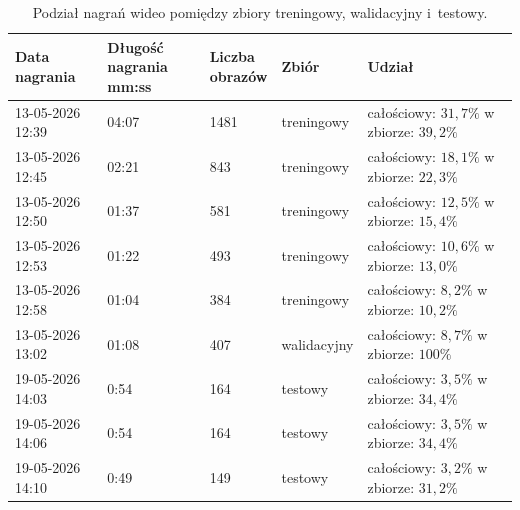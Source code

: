 \begin{table}[ht]
    \caption{Podział nagrań wideo pomiędzy zbiory treningowy, walidacyjny i~testowy.}
    \label{tab:video_split}
    \begin{tabularx}{\textwidth}{X|llll}
        \toprule
        \textbf{Data nagrania} &
        \makecell[tl]{\textbf{Długość nagrania} \\mm:ss} &
        \makecell[tl]{\textbf{Liczba}           \\\textbf{obrazów}} &
        \textbf{Zbiór}         &
        \textbf{Udział}                         \\
        \midrule
        \makecell[tl]{13-05-2026                \\12:39} & 04:07 & 1481 & treningowy & \makecell[tl]{całościowy: $31,7\%$\\w zbiorze: $39,2\%$} \\
        \makecell[tl]{13-05-2026                \\12:45} & 02:21 & 843 & treningowy & \makecell[tl]{całościowy: $18,1\%$\\w zbiorze: $22,3\%$} \\
        \makecell[tl]{13-05-2026                \\12:50} & 01:37 & 581 & treningowy & \makecell[tl]{całościowy: $12,5\%$\\w zbiorze: $15,4\%$} \\
        \makecell[tl]{13-05-2026                \\12:53} & 01:22 & 493 & treningowy & \makecell[tl]{całościowy: $10,6\%$\\w zbiorze: $13,0\%$} \\
        \makecell[tl]{13-05-2026                \\12:58} & 01:04 & 384 & treningowy & \makecell[tl]{całościowy: $8,2\%$\\w zbiorze: $10,2\%$} \\
        \makecell[tl]{13-05-2026                \\13:02} & 01:08 & 407 & walidacyjny & \makecell[tl]{całościowy: $8,7\%$\\w zbiorze: $100\%$} \\
        \makecell[tl]{19-05-2026                \\14:03} & 0:54 & 164 & testowy & \makecell[tl]{całościowy: $3,5\%$\\w zbiorze: $34,4\%$} \\
        \makecell[tl]{19-05-2026                \\14:06} & 0:54 & 164 & testowy & \makecell[tl]{całościowy: $3,5\%$\\w zbiorze: $34,4\%$} \\
        \makecell[tl]{19-05-2026                \\14:10} & 0:49 & 149 & testowy & \makecell[tl]{całościowy: $3,2\%$\\w zbiorze: $31,2\%$} \\
        \bottomrule
    \end{tabularx}
\end{table}

